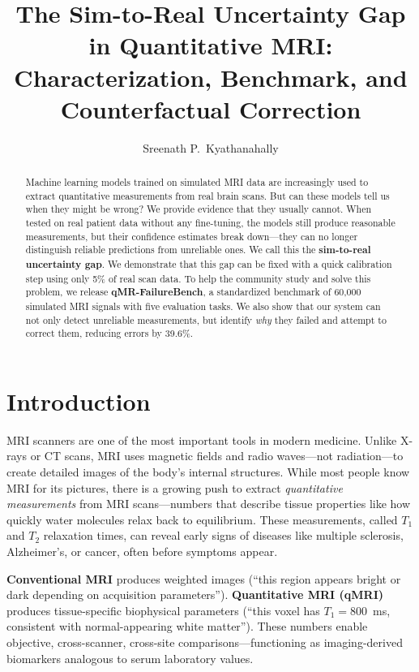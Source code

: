 \documentclass[11pt,a4paper]{article}
\title{\textbf{The Sim-to-Real Uncertainty Gap in Quantitative MRI:\\Characterization, Benchmark, and Counterfactual Correction}}
\author{Sreenath P.\ Kyathanahally}
\date{}
\date{}
\begin{document}
\maketitle

\begin{abstract}
Machine learning models trained on simulated MRI data are increasingly used to extract quantitative measurements from real brain scans. But can these models tell us when they might be wrong? We provide evidence that they usually cannot. When tested on real patient data without any fine-tuning, the models still produce reasonable measurements, but their confidence estimates break down---they can no longer distinguish reliable predictions from unreliable ones. We call this the \textbf{sim-to-real uncertainty gap}. We demonstrate that this gap can be fixed with a quick calibration step using only 5\% of real scan data. To help the community study and solve this problem, we release \textbf{qMR-FailureBench}, a standardized benchmark of 60,000 simulated MRI signals with five evaluation tasks. We also show that our system can not only detect unreliable measurements, but identify \emph{why} they failed and attempt to correct them, reducing errors by 39.6\%.
\end{abstract}

\section{Introduction}
\label{sec:intro}

MRI scanners are one of the most important tools in modern medicine. Unlike X-rays or CT scans, MRI uses magnetic fields and radio waves---not radiation---to create detailed images of the body's internal structures. While most people know MRI for its pictures, there is a growing push to extract \emph{quantitative measurements} from MRI scans---numbers that describe tissue properties like how quickly water molecules relax back to equilibrium. These measurements, called $T_1$ and $T_2$ relaxation times, can reveal early signs of diseases like multiple sclerosis, Alzheimer's, or cancer, often before symptoms appear.

\begin{intuition}
\textbf{Conventional MRI} produces weighted images (``this region appears bright or dark depending on acquisition parameters''). \textbf{Quantitative MRI (qMRI)} produces tissue-specific biophysical parameters (``this voxel has $T_1 = 800$~ms, consistent with normal-appearing white matter''). These numbers enable objective, cross-scanner, cross-site comparisons---functioning as imaging-derived biomarkers analogous to serum laboratory values.
\end{intuition}
\end{document}
